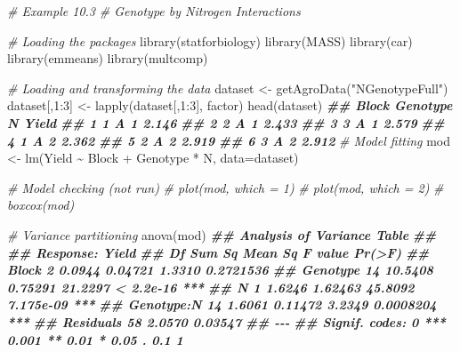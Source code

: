 \documentclass[
  12pt,
]{book}
\newenvironment{Shaded}{\begin{snugshade}}{\end{snugshade}}
\newcommand{\AttributeTok}[1]{\textcolor[rgb]{0.77,0.63,0.00}{#1}}
\newcommand{\CommentTok}[1]{\textcolor[rgb]{0.56,0.35,0.01}{\textit{#1}}}
\newcommand{\DecValTok}[1]{\textcolor[rgb]{0.00,0.00,0.81}{#1}}
\newcommand{\DocumentationTok}[1]{\textcolor[rgb]{0.56,0.35,0.01}{\textbf{\textit{#1}}}}
\newcommand{\FunctionTok}[1]{\textcolor[rgb]{0.00,0.00,0.00}{#1}}
\newcommand{\NormalTok}[1]{#1}
\newcommand{\OtherTok}[1]{\textcolor[rgb]{0.56,0.35,0.01}{#1}}
\newcommand{\SpecialCharTok}[1]{\textcolor[rgb]{0.00,0.00,0.00}{#1}}
\newcommand{\StringTok}[1]{\textcolor[rgb]{0.31,0.60,0.02}{#1}}
\begin{document}
\begin{Shaded}
\begin{Highlighting}[]
\CommentTok{\# Example 10.3}
\CommentTok{\# Genotype by Nitrogen Interactions}

\CommentTok{\# Loading the packages}
\FunctionTok{library}\NormalTok{(statforbiology)}
\FunctionTok{library}\NormalTok{(MASS)}
\FunctionTok{library}\NormalTok{(car)}
\FunctionTok{library}\NormalTok{(emmeans)}
\FunctionTok{library}\NormalTok{(multcomp)}

\CommentTok{\# Loading and transforming the data}
\NormalTok{dataset }\OtherTok{\textless{}{-}} \FunctionTok{getAgroData}\NormalTok{(}\StringTok{"NGenotypeFull"}\NormalTok{)}
\NormalTok{dataset[,}\DecValTok{1}\SpecialCharTok{:}\DecValTok{3}\NormalTok{] }\OtherTok{\textless{}{-}} \FunctionTok{lapply}\NormalTok{(dataset[,}\DecValTok{1}\SpecialCharTok{:}\DecValTok{3}\NormalTok{], factor)}
\FunctionTok{head}\NormalTok{(dataset)}
\DocumentationTok{\#\#   Block Genotype N Yield}
\DocumentationTok{\#\# 1     1        A 1 2.146}
\DocumentationTok{\#\# 2     2        A 1 2.433}
\DocumentationTok{\#\# 3     3        A 1 2.579}
\DocumentationTok{\#\# 4     1        A 2 2.362}
\DocumentationTok{\#\# 5     2        A 2 2.919}
\DocumentationTok{\#\# 6     3        A 2 2.912}
\CommentTok{\# Model fitting}
\NormalTok{mod }\OtherTok{\textless{}{-}} \FunctionTok{lm}\NormalTok{(Yield }\SpecialCharTok{\textasciitilde{}}\NormalTok{ Block }\SpecialCharTok{+}\NormalTok{ Genotype }\SpecialCharTok{*}\NormalTok{ N, }\AttributeTok{data=}\NormalTok{dataset)}

\CommentTok{\# Model checking (not run)}
\CommentTok{\# plot(mod, which = 1)}
\CommentTok{\# plot(mod, which = 2)}
\CommentTok{\# boxcox(mod)}

\CommentTok{\# Variance partitioning}
\FunctionTok{anova}\NormalTok{(mod)}
\DocumentationTok{\#\# Analysis of Variance Table}
\DocumentationTok{\#\# }
\DocumentationTok{\#\# Response: Yield}
\DocumentationTok{\#\#            Df  Sum Sq Mean Sq F value    Pr(\textgreater{}F)    }
\DocumentationTok{\#\# Block       2  0.0944 0.04721  1.3310 0.2721536    }
\DocumentationTok{\#\# Genotype   14 10.5408 0.75291 21.2297 \textless{} 2.2e{-}16 ***}
\DocumentationTok{\#\# N           1  1.6246 1.62463 45.8092 7.175e{-}09 ***}
\DocumentationTok{\#\# Genotype:N 14  1.6061 0.11472  3.2349 0.0008204 ***}
\DocumentationTok{\#\# Residuals  58  2.0570 0.03547                      }
\DocumentationTok{\#\# {-}{-}{-}}
\DocumentationTok{\#\# Signif. codes:  0 \textquotesingle{}***\textquotesingle{} 0.001 \textquotesingle{}**\textquotesingle{} 0.01 \textquotesingle{}*\textquotesingle{} 0.05 \textquotesingle{}.\textquotesingle{} 0.1 \textquotesingle{} \textquotesingle{} 1}
\end{Highlighting}
\end{Shaded}
\end{document}
